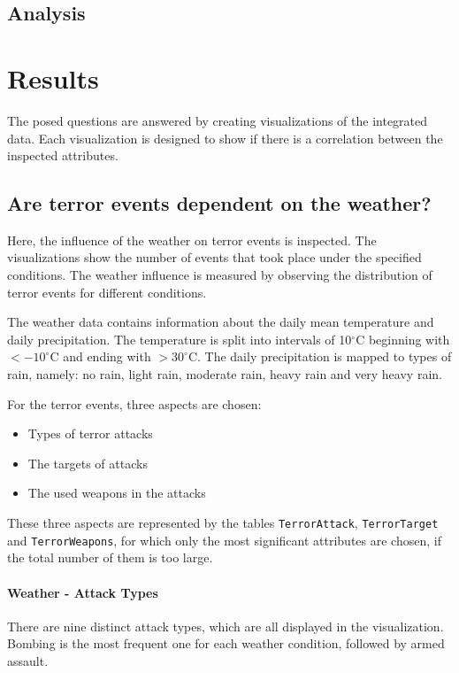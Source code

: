 \subsection{Analysis}




\section{Results}
The posed questions are answered by creating visualizations of the integrated data. Each visualization is designed to show if there is a correlation between the inspected attributes.

\subsection{Are terror events dependent on the weather?}
Here, the influence of the weather on terror events is inspected. The visualizations show the number of events that took place under the specified conditions. The weather influence is measured by observing the distribution of terror events for different conditions.

The weather data contains information about the daily mean temperature and daily precipitation. The temperature is split into intervals of 10$^\circ$C beginning with $< -10^\circ$C and ending with $> 30^\circ$C. The daily precipitation is mapped to types of rain, namely: no rain, light rain, moderate rain, heavy rain and very heavy rain.

For the terror events, three aspects are chosen:
\begin{itemize}
	\item Types of terror attacks
	\item The targets of attacks
	\item The used weapons in the attacks
\end{itemize}

These three aspects are represented by the tables \texttt{TerrorAttack}, \texttt{TerrorTarget} and \texttt{TerrorWeapons}, for which only the most significant attributes are chosen, if the total number of them is too large.

\paragraph{Weather - Attack Types}
There are nine distinct attack types, which are all displayed in the visualization. Bombing is the most frequent one for each weather condition, followed by armed assault.

